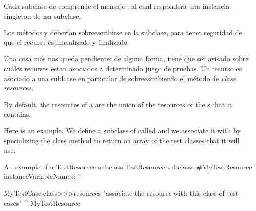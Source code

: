 \documentclass[a4paper,10pt,twoside]{book}
\begin{document}
Cada subclase de   comprende el mensaje , al cual responder\'a una instancia singleton de esa subclase.

Los m\'etodos  y  deber\'ian sobreescribirse en la subclase, para tener seguridad de que el
recurso es inicializado y finalizado. 

Una cosa m\'as nos queda pendiente: de alguna forma, \sunit tiene que ser avisado sobre cu\'ales recursos
estan asociados a determinado juego de pruebas.
Un recurso es asociado a una sublcase en particular de   sobreescribiendo el m\'etodo de \emph{clase}
\emph{resources}.

By default, the resources of 
a  are
the union of the resources of
the s that it contains.

Here is an example. 
We define a subclass of  called
 and we associate it with 
by specializing the class method  to return an array
of the test classes that it will use.

\begin{classdef}[mytestresource]{An example of a TestResource subclass}
TestResource subclass: #MyTestResource
	instanceVariableNames: ''

MyTestCase class>>>resources
	"associate the resource with this class of test cases"
	^{ MyTestResource }
\end{classdef}






\end{document}
